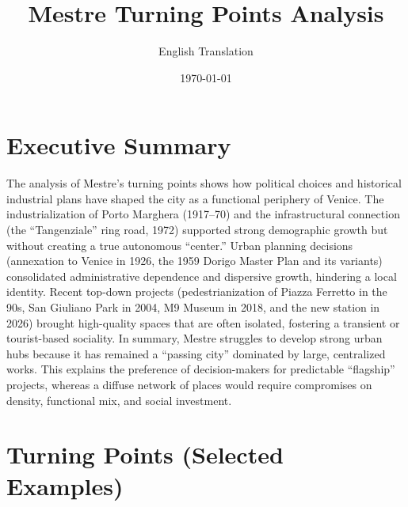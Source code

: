 \documentclass[a4paper,11pt]{article}
\title{Mestre Turning Points Analysis}
\author{English Translation}
\date{\today}
\begin{document}
\maketitle

\section*{Executive Summary}
The analysis of Mestre's turning points shows how political choices and historical industrial plans have shaped the city as a functional periphery of Venice. The industrialization of Porto Marghera (1917--70) and the infrastructural connection (the ``Tangenziale'' ring road, 1972) supported strong demographic growth but without creating a true autonomous ``center.'' Urban planning decisions (annexation to Venice in 1926, the 1959 Dorigo Master Plan and its variants) consolidated administrative dependence and dispersive growth, hindering a local identity. Recent top-down projects (pedestrianization of Piazza Ferretto in the 90s, San Giuliano Park in 2004, M9 Museum in 2018, and the new station in 2026) brought high-quality spaces that are often isolated, fostering a transient or tourist-based sociality. In summary, Mestre struggles to develop strong urban hubs because it has remained a ``passing city'' dominated by large, centralized works. This explains the preference of decision-makers for predictable ``flagship'' projects, whereas a diffuse network of places would require compromises on density, functional mix, and social investment.

\section*{Turning Points (Selected Examples)}
\end{document}
